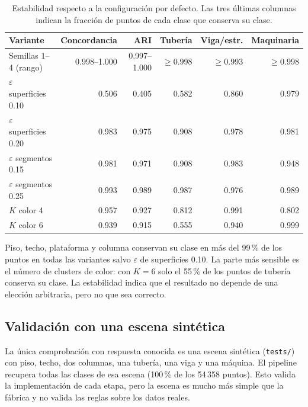 \documentclass[11pt,a4paper]{article}
\begin{document}
\begin{table}[H]
  \centering
  \small
  \begin{tabular}{lrrrrr}
    \toprule
    Variante & Concordancia & ARI & Tubería & Viga/estr. & Maquinaria \\
    \midrule
    Semillas 1--4 (rango)          & 0.998--1.000 & 0.997--1.000 & $\geq$0.998 & $\geq$0.993 & $\geq$0.998 \\
    $\varepsilon$ superficies 0.10 & 0.506 & 0.405 & 0.582 & 0.860 & 0.979 \\
    $\varepsilon$ superficies 0.20 & 0.983 & 0.975 & 0.908 & 0.978 & 0.981 \\
    $\varepsilon$ segmentos 0.15   & 0.981 & 0.971 & 0.908 & 0.983 & 0.948 \\
    $\varepsilon$ segmentos 0.25   & 0.993 & 0.989 & 0.987 & 0.976 & 0.989 \\
    $K$ color 4                    & 0.957 & 0.927 & 0.812 & 0.991 & 0.802 \\
    $K$ color 6                    & 0.939 & 0.915 & 0.555 & 0.940 & 0.999 \\
    \bottomrule
  \end{tabular}
  \caption{Estabilidad respecto a la configuración por defecto. Las tres
    últimas columnas indican la fracción de puntos de cada clase que conserva
    su clase.}
  \label{tab:estabilidad}
\end{table}

Piso, techo, plataforma y columna conservan su clase en más del 99\,\% de los
puntos en todas las variantes salvo $\varepsilon$ de superficies 0.10. La parte
más sensible es el número de clusters de color: con $K=6$ solo el 55\,\% de los
puntos de tubería conserva su clase. La estabilidad indica que el resultado no
depende de una elección arbitraria, pero no que sea correcto.

\subsection{Validación con una escena sintética}

La única comprobación con respuesta conocida es una escena sintética
(\texttt{tests/}) con piso, techo, dos columnas, una tubería, una viga y una
máquina. El pipeline recupera todas las clases de esa escena (100\,\% de los
54\,358 puntos). Esto valida la implementación de cada etapa, pero la escena es
mucho más simple que la fábrica y no valida las reglas sobre los datos reales.

\end{document}
